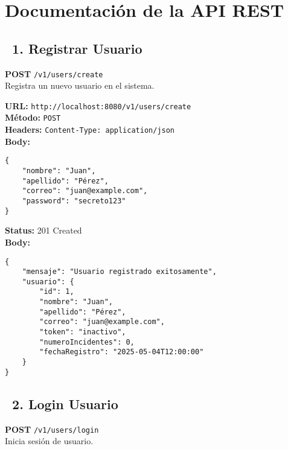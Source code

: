 \section*{Documentación de la API REST}


\subsection*{\faServer\ 1. Registrar Usuario}
\begin{tcolorbox}[endpoint]
    \textbf{POST} \texttt{/v1/users/create}\\
    Registra un nuevo usuario en el sistema.
\end{tcolorbox}

\begin{tcolorbox}[request]
    \textbf{URL:} \textcolor{urlColor}{\texttt{http://localhost:8080/v1/users/create}}\\
    \textbf{Método:} \textcolor{methodColor}{\texttt{POST}}\\
    \textbf{Headers:} \textcolor{headerColor}{\texttt{Content-Type: application/json}}\\
    \textbf{Body:}
    \begin{verbatim}
{
    "nombre": "Juan",
    "apellido": "Pérez",
    "correo": "juan@example.com",
    "password": "secreto123"
}
    \end{verbatim}
\end{tcolorbox}

\begin{tcolorbox}[response]
    \textbf{Status:} 201 Created\\
    \textbf{Body:}
    \begin{verbatim}
{
    "mensaje": "Usuario registrado exitosamente",
    "usuario": {
        "id": 1,
        "nombre": "Juan",
        "apellido": "Pérez",
        "correo": "juan@example.com",
        "token": "inactivo",
        "numeroIncidentes": 0,
        "fechaRegistro": "2025-05-04T12:00:00"
    }
}
    \end{verbatim}
\end{tcolorbox}

\subsection*{\faServer\ 2. Login Usuario}
\begin{tcolorbox}[endpoint]
    \textbf{POST} \texttt{/v1/users/login}\\
    Inicia sesión de usuario.
\end{tcolorbox}

